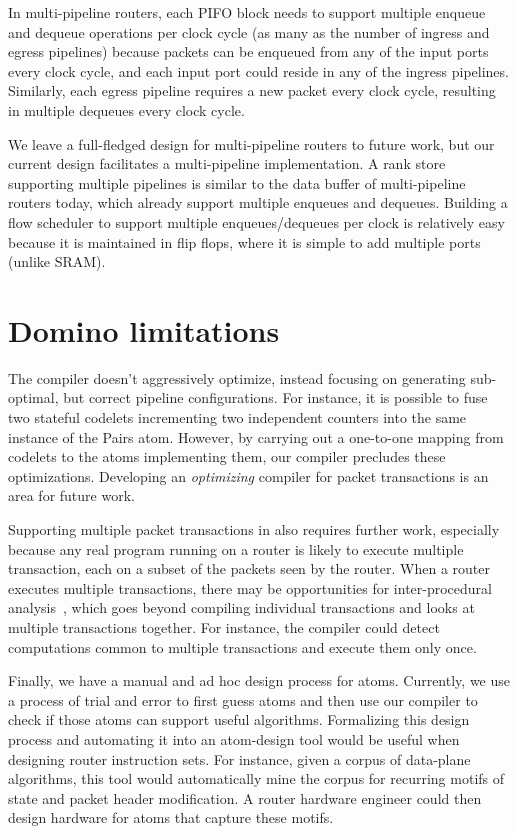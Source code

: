 In multi-pipeline routers, each PIFO block needs to support multiple enqueue
and dequeue operations per clock cycle (as many as the number of ingress and
egress pipelines) because packets can be enqueued from any of the input ports
every clock cycle, and each input port could reside in any of the ingress
pipelines. Similarly, each egress pipeline requires a new packet every clock
cycle, resulting in multiple dequeues every clock cycle.

We leave a full-fledged design for multi-pipeline routers to future work, but
our current design facilitates a multi-pipeline implementation. A rank store
supporting multiple pipelines is similar to the data buffer of multi-pipeline
routers today, which already support multiple enqueues and dequeues. Building a
flow scheduler to support multiple enqueues/dequeues per clock is relatively
easy because it is maintained in flip flops, where it is simple to add multiple
ports (unlike SRAM).

\section{Domino limitations}
\label{sec:domino_limitations}
The \pktlanguage compiler doesn't aggressively optimize, instead focusing on
generating sub-optimal, but correct pipeline configurations. For instance, it is
possible to fuse two stateful codelets incrementing two independent counters
into the same instance of the Pairs atom. However, by carrying out a one-to-one
mapping from codelets to the atoms implementing them, our compiler precludes
these optimizations.  Developing an {\em optimizing} compiler for packet
transactions is an area for future work.

Supporting multiple packet transactions in \pktlanguage also requires further
work, especially because any real program running on a router is likely to
execute multiple transaction, each on a subset of the packets seen by the
router. When a router executes multiple transactions, there may be
opportunities for inter-procedural analysis~\cite{dragonbook}, which goes
beyond compiling individual transactions and looks at multiple transactions
together.  For instance, the compiler could detect computations common to
multiple transactions and execute them only once.

Finally, we have a manual and ad hoc design process for atoms. Currently, we
use a process of trial and error to first guess atoms and then use our compiler
to check if those atoms can support useful algorithms.  Formalizing this design
process and automating it into an atom-design tool would be useful when
designing router instruction sets. For instance, given a corpus of data-plane
algorithms, this tool would automatically mine the corpus for recurring motifs
of state and packet header modification. A router hardware engineer could then
design hardware for atoms that capture these motifs.

